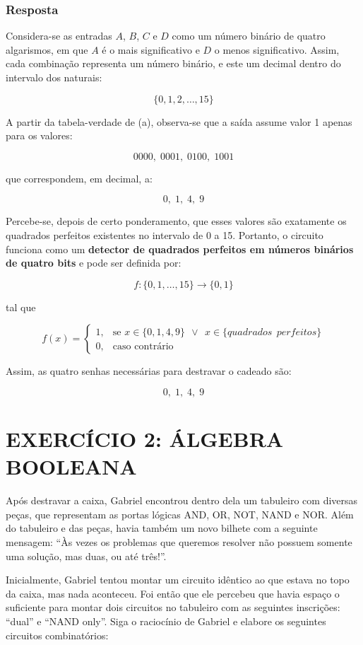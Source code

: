 \documentclass[12pt]{article}
\begin{document}
\subsubsection*{Resposta}

Considera-se as entradas $A$, $B$, $C$ e $D$ como um número binário de quatro algarismos, em que $A$ é o mais significativo e $D$ o menos significativo. Assim, cada combinação representa um número binário, e este um decimal dentro do intervalo dos naturais:

\[
\{0,1,2,\dots,15\}
\]

A partir da tabela-verdade de (a), observa-se que a saída assume valor 1 apenas para os valores:

\[
0000,\;0001,\;0100,\;1001
\]

que correspondem, em decimal, a:

\[
0,\;1,\;4,\;9
\]

Percebe-se, depois de certo ponderamento, que esses valores são exatamente os quadrados perfeitos existentes no intervalo de 0 a 15.
Portanto, o circuito funciona como um \textbf{detector de quadrados perfeitos em números binários de quatro bits} e pode ser definida por:

\[
f:\{0,1,\dots,15\}\to\{0,1\}
\]

tal que

\[
f(x)=
\begin{cases}
1, & \text{se } x \in \{0,1,4,9\} \ \ \lor  \ \ x \in \{ quadrados  \ \ perfeitos \}\\
0, & \text{caso contrário}
\end{cases}
\]


Assim, as quatro senhas necessárias para destravar o cadeado são:

\[
\boxed{0,\;1,\;4,\;9}
\]

\section{EXERCÍCIO 2: ÁLGEBRA BOOLEANA}

\begin{tcolorbox}[title=Enunciado da Questão,colback=gray!5,colframe=black]
Após destravar a caixa, Gabriel encontrou dentro dela um tabuleiro com diversas
peças, que representam as portas lógicas AND, OR, NOT, NAND e NOR. Além do tabuleiro
e das peças, havia também um novo bilhete com a seguinte mensagem: “Às vezes os
problemas que queremos resolver não possuem somente uma solução, mas duas, ou até
três!”.

Inicialmente, Gabriel tentou montar um circuito idêntico ao que estava no topo da
caixa, mas nada aconteceu. Foi então que ele percebeu que havia espaço o suficiente para
montar dois circuitos no tabuleiro com as seguintes inscrições: “dual” e “NAND only”. Siga
o raciocínio de Gabriel e elabore os seguintes circuitos combinatórios:
\end{tcolorbox}
\end{document}
